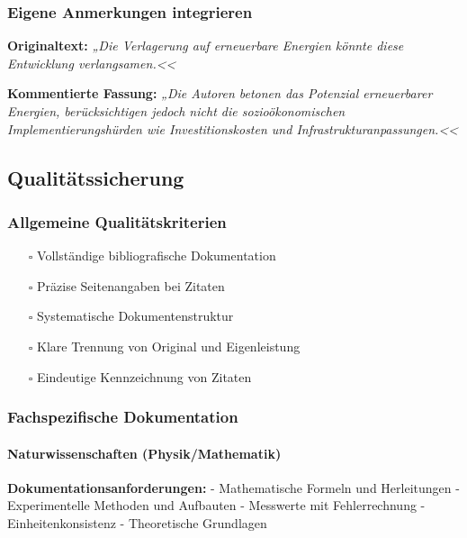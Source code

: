 \documentclass{vorlage-design-main}
\begin{document}
\subsubsection{Eigene Anmerkungen
integrieren}\label{eigene-anmerkungen-integrieren}

\textbf{Originaltext:} \emph{„Die Verlagerung auf erneuerbare Energien
könnte diese Entwicklung verlangsamen.<<}

\textbf{Kommentierte Fassung:} \emph{„Die Autoren betonen das Potenzial
erneuerbarer Energien, berücksichtigen jedoch nicht die
sozioökonomischen Implementierungshürden wie Investitionskosten und
Infrastrukturanpassungen.<<}

\subsection{Qualitätssicherung}\label{qualitaetssicherung}

\subsubsection{Allgemeine
Qualitätskriterien}\label{allgemeine-qualitaetskriterien}

\begin{itemize}

\item[$\square$]
  Vollständige bibliografische Dokumentation
\item[$\square$]
  Präzise Seitenangaben bei Zitaten
\item[$\square$]
  Systematische Dokumentenstruktur
\item[$\square$]
  Klare Trennung von Original und Eigenleistung
\item[$\square$]
  Eindeutige Kennzeichnung von Zitaten
\end{itemize}

\subsubsection{Fachspezifische
Dokumentation}\label{fachspezifische-dokumentation}

\paragraph{Naturwissenschaften
(Physik/Mathematik)}\label{naturwissenschaften-physikmathematik}

\textbf{Dokumentationsanforderungen:} - Mathematische Formeln und
Herleitungen - Experimentelle Methoden und Aufbauten - Messwerte mit
Fehlerrechnung - Einheitenkonsistenz - Theoretische Grundlagen
\end{document}

